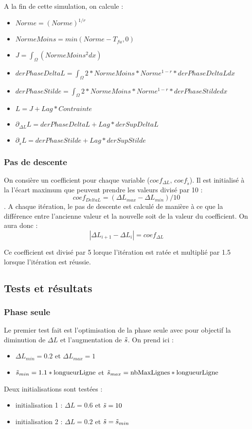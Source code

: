 \documentclass[11pt,a4paper]{article}
\begin{document}
A la fin de cette simulation, on calcule :

\begin{itemize}
	\item $Norme=(Norme)^{1/r}$
	\item $NormeMoins=min(Norme-T_{fu},0) $
	\item $J=\int_{\Omega}(NormeMoins^2dx)$
	\item $derPhaseDeltaL=\int_{\Omega}2*NormeMoins*Norme^{1-r}*derPhaseDeltaLdx$
	\item $derPhaseStilde=\int_{\Omega}2*NormeMoins*Norme^{1-r}*derPhaseStildedx$
	\item $L=J+Lag*Contrainte$
	\item $\partial_{\Delta L}L=derPhaseDeltaL+Lag*derSupDeltaL$
	\item $\partial_{\tilde{s}}L=derPhaseStilde+Lag*derSupStilde$	
\end{itemize}


\subsubsection*{Pas de descente}
On consière un coefficient pour chaque variable ($coef_{\Delta L},\,coef_{\tilde{s}}$). Il est initialisé à la l'écart maximum que peuvent prendre les valeurs divisé par 10 :
\begin{equation}
coef_{Delta L}=\left(\Delta L _{max}-\Delta L_{min}\right)/10
\end{equation}. 
A chaque itération, le pas de descente est calculé de manière à ce que la différence entre l'ancienne valeur et la nouvelle soit de la valeur du coefficient. On aura donc :
\begin{equation}
|\Delta L_{i+1}-\Delta L_{i}|=coef_{\Delta L}
\end{equation}

Ce coefficient est divisé par 5 lorque l'itération est ratée et multiplié par 1.5 lorsque l'itération est réussie.

\subsection*{Tests et résultats}

\subsubsection*{Phase seule}
Le premier test fait est l'optimisation de la phase seule avec pour objectif la diminution de $\Delta L$ et l'augmentation de $\tilde{s}$. On prend ici :
\begin{itemize}
	\item $\Delta L_{min}=0.2$ et $\Delta L_{max}=1$
	\item $\tilde{s}_{min}=1.1*\textrm{longueurLigne}$ et $\tilde{s}_{max}=\textrm{nbMaxLignes}*\textrm{longueurLigne}$
\end{itemize}
Deux initialisations sont testées :
\begin{itemize}
	\item initialisation 1 : $\Delta L=0.6$ et $\tilde{s}=10$
	\item initialisation 2 : $\Delta L=0.2$ et $\tilde{s}=\tilde{s}_{min}$
\end{itemize}
\end{document}

